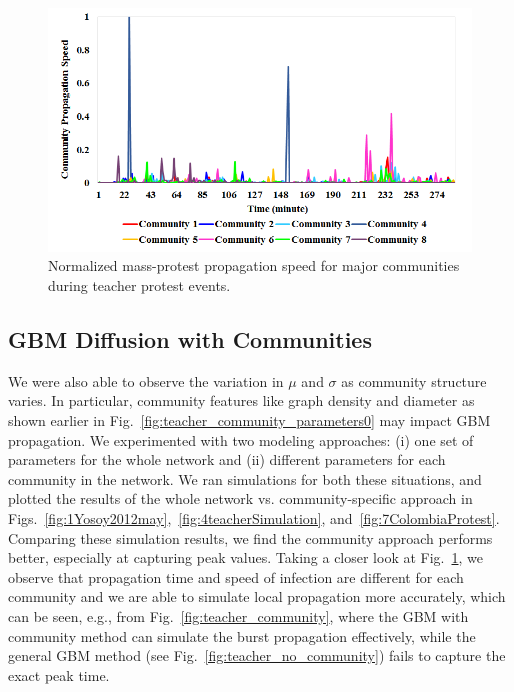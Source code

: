 \begin{figure}[ht]
\centering
\includegraphics[width=4.5in] {figures/4teacher-community-speed.png}
\caption{Normalized mass-protest propagation speed for major communities during teacher protest events.}
\label{fig:teacher_community_speed}
\end{figure}



\subsection{GBM Diffusion with Communities}
We were also able to observe the variation in $\mu$ and $\sigma$ as community structure varies. In particular, community features like graph density and diameter as shown earlier in Fig.~\ref{fig:teacher_community_parameters0} may impact GBM propagation.
We experimented with two modeling approaches: (i) one set of parameters for the whole network and (ii)
different parameters
for each community in the network.
We ran simulations for both these situations,
and plotted the results of the whole network vs. community-specific approach in Figs.~\ref{fig:1Yosoy2012may},~\ref{fig:4teacherSimulation}, and~\ref{fig:7ColombiaProtest}.
Comparing these simulation results, we find the community approach performs better, especially at capturing peak values. Taking a closer look at Fig.~\ref{fig:teacher_community_speed}, we observe that propagation time and speed of infection are different for each community and we are able to simulate local propagation more accurately, which can be seen, e.g.,
from Fig.~\ref{fig:teacher_community}, where
the GBM with community method can simulate the burst
propagation effectively, while the general GBM method (see Fig.~\ref{fig:teacher_no_community}) fails to capture the exact peak time.


